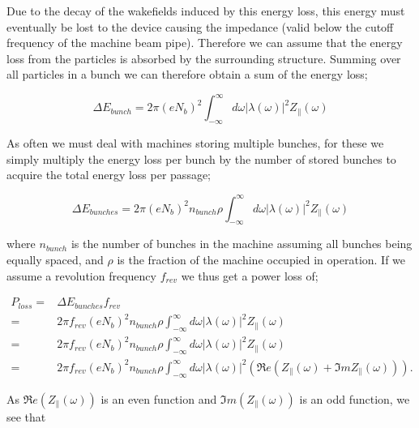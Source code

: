 Due to the decay of the wakefields induced by this energy loss, this energy must eventually be lost to the device causing the impedance (valid below the cutoff frequency of the machine beam pipe). Therefore we can assume that the energy loss from the particles is absorbed by the surrounding structure. Summing over all particles in a bunch we can therefore obtain a sum of the energy loss;

\begin{equation}
\Delta E_{bunch} = 2\pi \left( eN_{b}   \right)^{2} \int^{\infty}_{-\infty} d\omega \left| \lambda \left( \omega \right)  \right|^{2} Z_{\parallel} \left( \omega \right)
\end{equation}

As often we must deal with machines storing multiple bunches, for these we simply multiply the energy loss per bunch by the number of stored bunches to acquire the total energy loss per passage;

\begin{equation}
\Delta E_{bunches} = 2\pi \left( eN_{b}   \right)^{2}n_{bunch}\rho \int^{\infty}_{-\infty} d\omega \left| \lambda \left( \omega \right)  \right|^{2} Z_{\parallel} \left( \omega \right)
\end{equation}

where $n_{bunch}$ is the number of bunches in the machine assuming all bunches being equally spaced, and $\rho$ is the fraction of the machine occupied in operation. If we assume a revolution frequency $f_{rev}$ we thus get a power loss of;

\begin{align}
P_{loss}  = & \Delta E_{bunches} f_{rev}\nonumber \\  
 = & 2\pi f_{rev} \left( eN_{b}   \right)^{2}n_{bunch}\rho \int^{\infty}_{-\infty} d\omega \left| \lambda \left( \omega \right)  \right|^{2} Z_{\parallel} \left( \omega \right) \nonumber  \\ 
 = & 2\pi f_{rev} \left( eN_{b}   \right)^{2}n_{bunch}\rho \int^{\infty}_{-\infty} d\omega \left| \lambda \left( \omega \right)  \right|^{2} Z_{\parallel} \left( \omega \right) \nonumber \\
 = & 2\pi f_{rev} \left( eN_{b}   \right)^{2}n_{bunch}\rho \int^{\infty}_{-\infty} d\omega \left| \lambda \left( \omega \right)  \right|^{2} \left( \Re{}e \left( Z_{\parallel} \left( \omega\right) + \Im{}m Z_{\parallel} \left( \omega\right) \right) \right).
\end{align}
 
As $\Re{}e\left(Z_{\parallel} \left( \omega\right)\right)$ is an even function and $\Im{}m\left(Z_{\parallel} \left( \omega\right)\right)$ is an odd function, we see that

